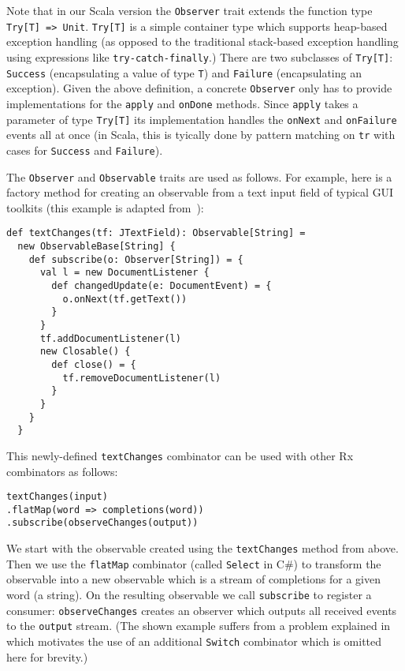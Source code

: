 \documentclass[runningheads]{llncs}
\begin{document}
\begin{sloppypar}
Note that in our Scala version the \verb|Observer| trait extends the function
type \verb|Try[T] => Unit|. \verb|Try[T]| is a simple container type which
supports heap-based exception handling (as opposed to the traditional stack-based
exception handling using expressions like \verb|try-catch-finally|.)
There are two subclasses of \verb|Try[T]|: \verb|Success| (encapsulating a
value of type \verb|T|) and \verb|Failure| (encapsulating an exception). Given
the above definition, a concrete \verb|Observer| only has to provide
implementations for the \verb|apply| and \verb|onDone| methods. Since
\verb|apply| takes a parameter of type \verb|Try[T]| its implementation
handles the \verb|onNext| and \verb|onFailure| events all at once (in Scala,
this is tyically done by pattern matching on \verb|tr| with cases for
\verb|Success| and \verb|Failure|).

The \verb|Observer| and \verb|Observable| traits are used as follows. For
example, here is a factory method for creating an observable from a text input
field of typical GUI toolkits (this example is adapted from~\cite{RxCACM}):

\lstset{numbers=none,xleftmargin=0em}
\begin{lstlisting}
def textChanges(tf: JTextField): Observable[String] =
  new ObservableBase[String] {
    def subscribe(o: Observer[String]) = {
      val l = new DocumentListener {
        def changedUpdate(e: DocumentEvent) = {
          o.onNext(tf.getText())
        }
      }
      tf.addDocumentListener(l)
      new Closable() {
        def close() = {
          tf.removeDocumentListener(l)
        }
      }
    }
  }
\end{lstlisting}

This newly-defined \verb|textChanges| combinator can be used with other Rx
combinators as follows:

\begin{lstlisting}
textChanges(input)
.flatMap(word => completions(word))
.subscribe(observeChanges(output))
\end{lstlisting}

We start with the observable created using the \verb|textChanges| method from
above. Then we use the \verb|flatMap| combinator (called \verb|Select| in C\#)
to transform the observable into a new observable which is a stream of
completions for a given word (a string). On the resulting observable we call
\verb|subscribe| to register a consumer: \verb|observeChanges| creates an
observer which outputs all received events to the \verb|output| stream. (The
shown example suffers from a problem explained in~\cite{RxCACM} which
motivates the use of an additional \verb|Switch| combinator which is omitted
here for brevity.)


\end{sloppypar}
\end{document}
